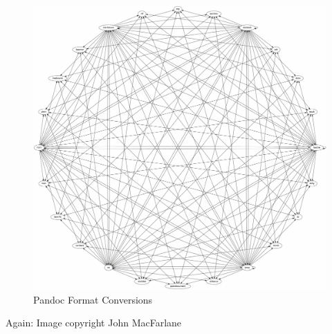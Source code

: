 \documentclass[oneside,]{memoir}
\makeatletter
\def\maxwidth{\ifdim\Gin@nat@width>\linewidth\linewidth
\else\Gin@nat@width\fi}
\let\Oldincludegraphics\includegraphics
\renewcommand{\includegraphics}[1]{\Oldincludegraphics[width=\maxwidth]{#1}}
\makeatother
\begin{document}
\begin{figure}[htbp]
\centering
\includegraphics{diagram.png}
\caption{Pandoc Format Conversions}
\end{figure}

Again: Image copyright John MacFarlane
\end{document}
